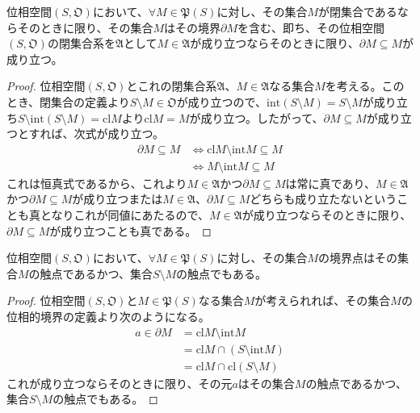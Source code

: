 \documentclass[dvipdfmx]{jsarticle}
\begin{document}
\begin{thm}\label{8.1.1.19}
位相空間$\left( S,\mathfrak{O} \right)$において、$\forall M \in \mathfrak{P}(S)$に対し、その集合$M$が閉集合であるならそのときに限り、その集合$M$はその境界$\partial M$を含む、即ち、その位相空間$\left( S,\mathfrak{O} \right)$の閉集合系を$\mathfrak{A}$として$M \in \mathfrak{A}$が成り立つならそのときに限り、$\partial M \subseteq M$が成り立つ。
\end{thm}
\begin{proof}
位相空間$\left( S,\mathfrak{O} \right)$とこれの閉集合系$\mathfrak{A}$、$M \in \mathfrak{A}$なる集合$M$を考える。このとき、閉集合の定義より$S \setminus M \in \mathfrak{O}$が成り立つので、${\mathrm{int}}(S \setminus M) = S \setminus M$が成り立ち$S \setminus {\mathrm{int}}(S \setminus M) = {\mathrm{cl}}M$より${\mathrm{cl}}M = M$が成り立つ。したがって、$\partial M \subseteq M$が成り立つとすれば、次式が成り立つ。
\begin{align*}
\partial M \subseteq M &\Leftrightarrow {\mathrm{cl}}M \setminus {\mathrm{int}}M \subseteq M\\
&\Leftrightarrow M \setminus {\mathrm{int}}M \subseteq M
\end{align*}
これは恒真式であるから、これより$M \in \mathfrak{A}$かつ$\partial M \subseteq M$は常に真であり、$M \in \mathfrak{A}$かつ$\partial M \subseteq M$が成り立つまたは$M \in \mathfrak{A}$、$\partial M \subseteq M$どちらも成り立たないということも真となりこれが同値にあたるので、$M \in \mathfrak{A}$が成り立つならそのときに限り、$\partial M \subseteq M$が成り立つことも真である。
\end{proof}
\begin{thm}\label{8.1.1.20}
位相空間$\left( S,\mathfrak{O} \right)$において、$\forall M \in \mathfrak{P}(S)$に対し、その集合$M$の境界点はその集合$M$の触点であるかつ、集合$S \setminus M$の触点でもある。
\end{thm}
\begin{proof}
位相空間$\left( S,\mathfrak{O} \right)$と$M \in \mathfrak{P}(S)$なる集合$M$が考えられれば、その集合$M$の位相的境界の定義より次のようになる。
\begin{align*}
a \in \partial M &= {\mathrm{cl}}M \setminus {\mathrm{int}}M\\
&= {\mathrm{cl}}M \cap \left( S \setminus {\mathrm{int}}M \right)\\
&= {\mathrm{cl}}M \cap {\mathrm{cl}}(S \setminus M)
\end{align*}
これが成り立つならそのときに限り、その元$a$はその集合$M$の触点であるかつ、集合$S \setminus M$の触点でもある。
\end{proof}
\end{document}

